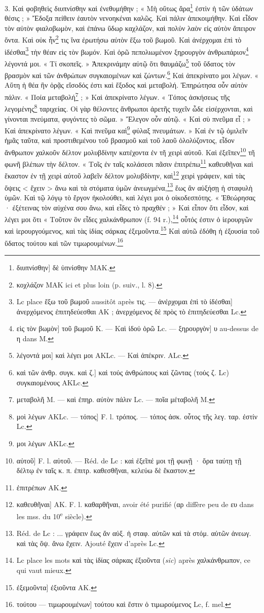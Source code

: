 \documentclass[a4paper, 11pt, oneside, polutonikogreek, french]{article}
\begin{document}
3. Καὶ φοβηθεὶς διυπνίσθην καὶ ἐνεθυμήθην ; « Μὴ οὕτως ἄρα\footnote{διυπνίσθην] δὲ ὑπνίσθην MAK.} ἐστὶν ἡ τῶν ὑδάτων θέσις ; » Ἔδοξα πείθειν ἑαυτὸν νενοηκέναι καλῶς. Καὶ πάλιν ἀπεκοιμήθην. Καὶ εἶδον τὸν αὐτὸν φιαλοβωμὸν, καὶ ἐπάνω ὕδωρ καχλάζον, καὶ πολὐν λαὸν εἰς αὐτὸν ἄπειρον ὄντα. Καὶ οὐκ ἧν\footnote{κοχλάζον MAK ici et plus loin (p. suiv., l. 8).} τις ἵνα ἐρωτήσω αὐτὸν ἔξω τοῦ βωμοῦ. Καὶ ἀνέρχομαι ἐπὶ τὸ ἰδέσθαι\footnote{Lc place ἔξω τοῦ βωμοῦ aussitôt après τις. --- ἀνέρχομαι ἐπὶ τὸ ίδέσθαι] ἀνερχόμενος ἐπιτηδεύεσθαι AK ; ἀνερχόμενος δὲ πρὸς τὸ ἐπιτηδεύεσθαι Lc.} τὴν θέαν εὶς τὸν βωμόν. Καὶ ὁρῶ πεπολιωμένον ξηρουργὸν ἀνθρωπάριον\footnote{εὶς τὸν βωμὸν] τοῦ βωμοῦ K. --- Καὶ ἰδοὐ ὁρῶ Lc. --- ξηρουργὸν] υ au-dessus de η dans M.} λέγοντά μοι. « Τί σκοπεῖς. » Ἀπεκρινάμην αὐτῷ ὅτι θαυμάζω\footnote{λέγοντά μοι] καὶ λέγει μοι AKLc. --- Καὶ ἀπέκριν. ALc.} τοῦ ὕδατος τὸν βρασμὸν καὶ τῶν ἀνθρώπων συγκαιομένων καὶ ζώντων.\footnote{καὶ τῶν ἀνθρ. συγκ. καὶ ζ.] καὶ τοὐς ἀνθρώπους καὶ ζῶντας (τοὐς ζ. Lc) συγκαιομένους AKLc.} Καὶ ἀπεκρίνατο μοι λέγων. « Αὕτη ἡ θέα ἣν ὁρᾷς εἴσοδός ἐστι καὶ ἔξοδος καὶ μεταβολή. Ἐπηρώτησα οὖν αὐτὸν πάλιν. « Ποία μεταβολή\footnote{μεταβολῆ M. --- καὶ ἐπηρ. αύτὸν πάλιν Lc. --- ποῖα μέταβολῆ M.} ; » Καὶ ἀπεκρίνατο λέγων. « Τόπος ἀσκήσεως τῆς λεγομένης\footnote{μοὶ λέγων AKLc. --- τόπος] F. l. τρόπος. --- τόπος ἀσκ. οὗτος τῆς λεγ. ταρ. ἐστίν Lc.} ταριχείας. Οἱ γὰρ θέλοντες ἄνθρωποι ἀρετῆς τυχεῖν ὧδε εἰσέρχονται, καὶ γίνονται πνεύματα, φυγόντες τὸ σῶμα. » Ἔλεγον οὖν αὐτῷ. « Καὶ σὺ πνεῦμα εἶ ; » Καὶ ἀπεκρίνατο λέγων. « Καὶ πνεῦμα καὶ\footnote{μοι λέγων AKLc.} φύλαξ πνευμάτων. » Καὶ ἐν τῷ ὁμιλεῖν ἡμᾶς ταῦτα, καὶ προστιθεμένου τοῦ βρασμοῦ καὶ τοῦ λαοῦ ὁλολύζοντος, εἶδον ἄνθρωπον χαλκοῦν δέλτον μολυβδίνην κατέχοντα ἐν τῆ χειρὶ αὐτοῦ. Καὶ ἐξεῖπεν\footnote{αὐτοῦ] F. l. αὑτοῦ. --- Réd. de Lc : καὶ ἐξεῖπέ μοι τῇ φωνῇ · ὄρα ταύτῃ τῇ δέλτῳ ἐν ταῖς κ. π. ἐπιτρ. καθεσθῆναι, κελεύω δὲ ἕκαστον.} τῆ φωνῆ βλέπων τὴν δέλτον. « Τοῖς ἐν ταῖς κολάσεσι πᾶσιν ἐπιτρέπω\footnote{ἐπιτρέπων AK.} καθευθῆναι καὶ ἕκαστον ἐν τῇ χειρὶ αὐτοῦ λαβεῖν δέλτον μολυβδίνην, καὶ\footnote{καθευθῆναι] AK. F. l. καθαρθῆναι, avoir été purifié (αρ diffère peu de ευ dans les mss. du 10\textsuperscript{e} siècle).} χειρὶ γράφειν, καὶ τὰς ὄψεις < ἔχειν > ἄνω καὶ τὰ στόματα ὑμῶν ἀνεωγμένα,\footnote{Réd. de Lc : ... γράφειν ἕως ἄν αὐξ. ἡ σταφ. αὐτῶν καὶ τὰ στόμ. αὐτῶν ἀνεωγ. καὶ τὰς ὄψ. ἄνω ἔχειν. Ajouté ἔχειν d'après Lc.} ἕως ἂν αὐξήσῃ ἡ σταφυλὴ ὑμῶν. Καὶ τῷ λόγῳ τὸ ἔργον ἠκολούθει, καὶ λέγει μοι ὁ οἰκοδεσπότης. « Ἐθεώρησας · ἐξέτεινας τὸν αὐχένα σου ἄνω, καὶ εἶδες τὸ πραχθέν ; » Καὶ εἶπον ὄτι εἶδον, καὶ λέγει μοι ὅτι « Τοῦτον ὃν εἶδες χαλκάνθρωπον (f. 94 r.),\footnote{Lc place les mots καὶ τὰς ἰδίας σάρκας ἐξιοῦντα (\emph{sic}) après χαλκάνθρωπον, ce qui vaut mieux.} οὗτός ἐστιν ὁ ἱερουργῶν καὶ ἱερουργούμενος, καὶ τὰς ἰδίας σάρκας ἐξεμοῦντα.\footnote{ἐξεμοῦντα] ἐξιοῦντα AK.} Καὶ αὐτῶ ἐδόθη ἡ ἐξουσία τοῦ ὕδατος τούτου καὶ τῶν τιμωρουμένων.\footnote{τούτου --- τιμωρουμένων] τούτου καὶ ἔστιν ὁ τιμωρούμενος Lc, f. mel.}
\end{document}
